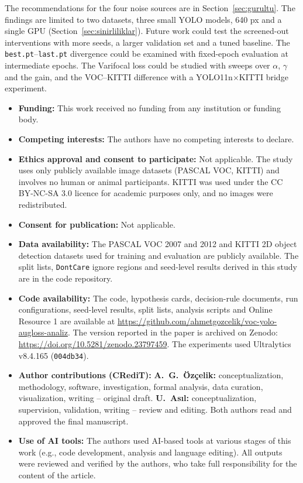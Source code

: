 \documentclass[pdflatex,iicol,sn-mathphys-num]{sn-jnl}
\begin{document}
The recommendations for the four noise sources are in Section~\ref{sec:gurultu}. The findings are limited to two datasets, three small YOLO models, 640 px and a single GPU (Section~\ref{sec:sinirliliklar}). Future work could test the screened-out interventions with more seeds, a larger validation set and a tuned baseline. The \texttt{best.pt}--\texttt{last.pt} divergence could be examined with fixed-epoch evaluation at intermediate epochs. The Varifocal loss could be studied with sweeps over $\alpha$, $\gamma$ and the gain, and the VOC--KITTI difference with a YOLO11n$\times$KITTI bridge experiment.

\backmatter


\begin{itemize}
\item \textbf{Funding:} This work received no funding from any institution or funding body.
\item \textbf{Competing interests:} The authors have no competing interests to declare.
\item \textbf{Ethics approval and consent to participate:} Not applicable. The study uses only publicly available image datasets (PASCAL VOC, KITTI) and involves no human or animal participants. KITTI was used under the CC BY-NC-SA 3.0 licence for academic purposes only, and no images were redistributed.
\item \textbf{Consent for publication:} Not applicable.
\item \textbf{Data availability:} The PASCAL VOC 2007 and 2012 and KITTI 2D object detection datasets used for training and evaluation are publicly available. The split lists, \texttt{DontCare} ignore regions and seed-level results derived in this study are in the code repository.
\item \textbf{Code availability:} The code, hypothesis cards, decision-rule documents, run configurations, seed-level results, split lists, analysis scripts and Online Resource 1 are available at \url{https://github.com/ahmetgozcelik/voc-yolo-augloss-analiz}. The version reported in the paper is archived on Zenodo: \url{https://doi.org/10.5281/zenodo.23797459}. The experiments used Ultralytics v8.4.165 (\texttt{004db34}).
\item \textbf{Author contributions (CRediT):} \textbf{A.~G.~Özçelik:} conceptualization, methodology, software, investigation, formal analysis, data curation, visualization, writing -- original draft. \textbf{U.~Asıl:} conceptualization, supervision, validation, writing -- review and editing. Both authors read and approved the final manuscript.
\item \textbf{Use of AI tools:} The authors used AI-based tools at various stages of this work (e.g., code development, analysis and language editing). All outputs were reviewed and verified by the authors, who take full responsibility for the content of the article.
\end{itemize}

\begin{appendices}

\end{appendices}


\end{document}
